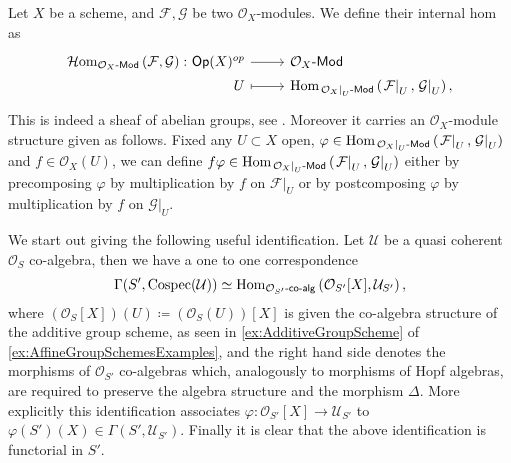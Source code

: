 \begin{defn}\label{defn:iHomOXMod}
	Let $X$ be a scheme, and $\mathcal{F}, \mathcal{G}$ be two $\mathcal{O}_{ X }$-modules.
	We define their internal hom as
	\begin{equation*}
	\begin{tikzcd}[row sep = 0ex
		,/tikz/column 1/.append style={anchor=base east}
		,/tikz/column 2/.append style={anchor=base west}]
		\mathcal{H}\mathrm{om}_{ \mathcal{O}_{ X }\text{-}\mathsf{Mod} }
		\left( \mathcal{F}, \mathcal{G} \right)\colon 
		\mathsf{Op}(X)^{op} \arrow[r, "", rightarrow] &
		\mathcal{O}_{ X }\text{-}\mathsf{Mod} \\
		U \arrow[r, "", mapsto] & 
		\Hom_{ \left.\mathcal{O}_{ X }\right|_{U}\text{-}\mathsf{Mod} } 
			\left( \left.\mathcal{F}\right|_{U}, \left.\mathcal{G}\right|_{U} \right)
	,\end{tikzcd}
	\end{equation*} 
	This is indeed a sheaf of abelian groups, see 
	\cite[\href{https://stacks.math.columbia.edu/tag/00AK}{Section 00AK}]{SP}.
	Moreover it carries an $\mathcal{O}_{ X }$-module structure given as follows.
	Fixed any $U \subset X$ open, 
	$\varphi \in \operatorname{Hom}_{ \left.\mathcal{O}_{ X }\right|_{U}\text{-}\mathsf{Mod}} 
	\left( \left.\mathcal{F}\right|_{U} , \left.\mathcal{G}\right|_{U} \right)$ and
	$f \in \mathcal{O}_{ X }(U)$, we can define $f \varphi \in
	\operatorname{Hom}_{ \left.\mathcal{O}_{ X }\right|_{U}\text{-}\mathsf{Mod}  } 
	\left( \left.\mathcal{F}\right|_{U} , \left.\mathcal{G}\right|_{U} \right)$
	either by precomposing $\varphi$ by multiplication
	by $f$ on $\left.\mathcal{F}\right|_{U}$ or by postcomposing $\varphi$
	by multiplication by $f$ on $\left.\mathcal{G}\right|_{U}$.
\end{defn}


\begin{rem}[]\label{rem:CospecSections}
	We start out giving the following useful identification.
	Let $\mathcal{U}$ be a quasi coherent $\mathcal{O}_{ S }$ co-algebra,
	then we have a one to one correspondence
	\begin{equation*}
	\Gamma(S', \operatorname{Cospec}(\mathcal{U})) \simeq
	\operatorname{Hom}_{ \mathcal{O}_{ S' }\text{-}\mathsf{co}\text{-}\mathsf{alg}} 
	\left( \mathcal{O}_{ S' }[X], \mathcal{U}_{S'} \right)
	,\end{equation*}
	where $(\mathcal{O}_{ S }[X])(U) \coloneqq (\mathcal{O}_{ S }(U))[X]$ 
	is given the co-algebra structure of the additive group scheme, as seen in
	\cref{ex:AdditiveGroupScheme} of \cref{ex:AffineGroupSchemesExamples},
	and the right hand side denotes the morphisms of $\mathcal{O}_{ S' }$
	co-algebras which, analogously to morphisms of Hopf algebras, 
	are required to preserve the algebra structure and the morphism $\Delta$.
	More explicitly this identification associates
	$\varphi\colon \mathcal{O}_{ S' }[X] \to \mathcal{U}_{S'}$ to
	$\varphi(S')(X) \in \Gamma(S', \mathcal{U}_{S'})$.
	Finally it is clear that the above identification is functorial in $S'$.
\end{rem}


